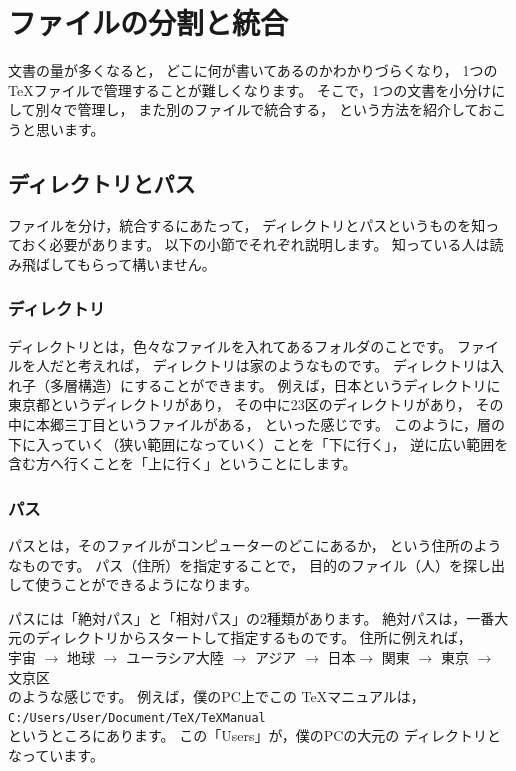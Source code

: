 \documentclass[class=jreport, crop=false, preview=false, dvipdfmx, a4paper, 14Q, fleqn]{standalone}
\begin{document}
\chapter{ファイルの分割と統合}
\label{ch:file-management}

文書の量が多くなると，
どこに何が書いてあるのかわかりづらくなり，
1つの{\TeX}ファイルで管理することが難しくなります。
そこで，1つの文書を小分けにして別々で管理し，
また別のファイルで統合する，
という方法を紹介しておこうと思います。



\section{ディレクトリとパス}
\label{sec:path-and-directory}
ファイルを分け，統合するにあたって，
ディレクトリとパスというものを知っておく必要があります。
以下の小節でそれぞれ説明します。
知っている人は読み飛ばしてもらって構いません。


\subsection{ディレクトリ}
ディレクトリとは，色々なファイルを入れてあるフォルダのことです。
ファイルを人だと考えれば，
ディレクトリは家のようなものです。
ディレクトリは入れ子（多層構造）にすることができます。
例えば，日本というディレクトリに東京都というディレクトリがあり，
その中に23区のディレクトリがあり，
その中に本郷三丁目というファイルがある，
といった感じです。
このように，層の下に入っていく（狭い範囲になっていく）ことを「下に行く」，
逆に広い範囲を含む方へ行くことを「上に行く」ということにします。


\subsection{パス}
パスとは，そのファイルがコンピューターのどこにあるか，
という住所のようなものです。
パス（住所）を指定することで，
目的のファイル（人）を探し出して使うことができるようになります。

パスには「絶対パス」と「相対パス」の2種類があります。
絶対パスは，一番大元のディレクトリからスタートして指定するものです。
住所に例えれば，\\
\hspace{5zw} 宇宙 $\rightarrow$ 地球 $\rightarrow$ ユーラシア大陸 $\rightarrow$ 
アジア $\rightarrow$ 日本$\rightarrow$ 関東 $\rightarrow$ 東京 $\rightarrow$ 文京区 \\
のような感じです。
例えば，僕のPC上でこの \TeX マニュアルは，\\
\hspace{5zw} \verb|C:/Users/User/Document/TeX/TeXManual| \\
というところにあります。
この「Users」が，僕のPCの大元の
ディレクトリとなっています。
\end{document}
